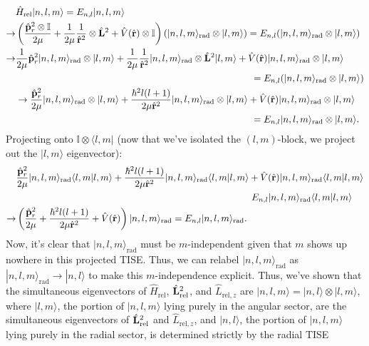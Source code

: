 \begin{align*}
    &\hat{H}_\text{rel}|n,l,m\rangle = E_{n,l}|n,l,m\rangle\\
    \rightarrow&\left(\frac{\vecop{p}^2_r\otimes\mathbb{I}}{2\mu}+\frac{1}{2\mu}\frac{1}{\vecop{r}^2}\otimes\vecop{L}^2+\hat{V}(\vecop{r})\otimes\mathbb{I}\right)\left(|n,l,m\rangle_\text{rad}\otimes|l,m\rangle  \right) = E_{n,l}(|n,l,m\rangle_\text{rad}\otimes|l,m\rangle)\\
    \rightarrow&\frac{1}{2\mu}\vecop{p}^2_r|n,l,m\rangle_\text{rad}\otimes |l,m\rangle+\frac{1}{2\mu}\frac{1}{\vecop{r}^2}|n,l,m\rangle_\text{rad}\otimes \vecop{L}^2|l,m\rangle + \hat{V}(\vecop{r})|n,l,m\rangle_\text{rad}\otimes|l,m\rangle\\
    &\hspace{250pt}=E_{n,l}(|n,l,m\rangle_\text{rad}\otimes|l,m\rangle)\\
    &\rightarrow \frac{\vecop{p}^2_r}{2\mu}|n,l,m\rangle_\text{rad}\otimes|l,m\rangle + \frac{\hbar^2l(l+1)}{2\mu\vecop{r}^2}|n,l,m\rangle_\text{rad}\otimes|l,m\rangle + \hat{V}(\vecop{r})|n,l,m\rangle_\text{rad}\otimes|l,m\rangle\\
    &\hspace{250pt}=E_{n,l}|n,l,m\rangle_\text{rad}\otimes|l,m\rangle.
\end{align*}
Projecting onto $\mathbb{I}\otimes\langle l,m|$ (now that we've isolated the $(l,m)$-block, we project out the $|l,m\rangle$ eigenvector):
\begin{align*}
    &\frac{\vecop{p}^2_r}{2\mu}|n,l,m\rangle_\text{rad}\langle l,m|l,m\rangle + \frac{\hbar^2l(l+1)}{2\mu\vecop{r}^2}|n,l,m\rangle_\text{rad}\langle l,m|l,m\rangle + \hat{V}(\vecop{r})|n,l,m\rangle_\text{rad}\langle l,m|l,m\rangle\\
    &\hspace{250pt}E_{n,l}|n,l,m\rangle_\text{rad}\langle l,m|l,m\rangle\\
    \rightarrow&\left(\frac{\vecop{p}^2_r}{2\mu} +\frac{\hbar^2l(l+1)}{2\mu\vecop{r}^2}+\hat{V}(\vecop{r}) \right)|n,l,m\rangle_\text{rad} = E_{n,l}|n,l,m\rangle_\text{rad}.
\end{align*}
Now, it's clear that $|n,l,m\rangle_\text{rad}$ must be $m$-independent given that $m$ shows up nowhere in this projected TISE. Thus, we can relabel $|n,l,m\rangle_\text{rad}$ as $|n,l,m\rangle_\text{rad}\rightarrow|n,l\rangle$ to make this $m$-independence explicit. Thus, we've shown that the simultaneous eigenvectors of $\hat{H}_\text{rel}$, $\hat{\mathbf{L}}_\text{rel}^2$, and $\hat{L}_{\text{rel},z}$ are $|n,l,m\rangle=|n,l\rangle\otimes|l,m\rangle$, where $|l,m\rangle$, the portion of $|n,l,m\rangle$ lying purely in the angular sector, are the simultaneous eigenvectors of $\hat{\mathbf{L}}^2_\text{rel}$ and $\hat{L}_{\text{rel},z}$, and $|n,l\rangle$, the portion of $|n,l,m\rangle$ lying purely in the radial sector, is determined strictly by the radial TISE%
